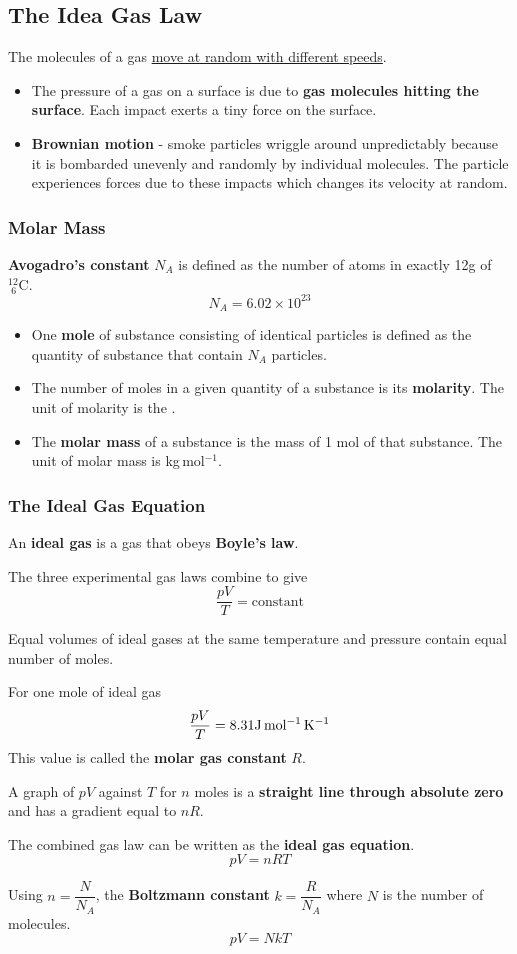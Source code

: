 \subsection{The Idea Gas Law}

The molecules of a gas \underline{move at random with different speeds}.
\begin{itemize}
    \item The pressure of a gas on a surface is due to \textbf{gas molecules hitting the surface}. Each impact exerts a tiny force on the surface.
    \item \textbf{Brownian motion} - smoke particles wriggle around unpredictably because it is bombarded unevenly and randomly by individual molecules. The particle experiences forces due to these impacts which changes its velocity at random.
\end{itemize}

\subsubsection*{Molar Mass}

\textbf{Avogadro's constant} $N_A$ is defined as the number of atoms in exactly 12g of $^{12}_{\hspace{4pt}6}\text{C}$.
$$N_A=6.02\times10^{23}$$

\begin{itemize}
    \item One \textbf{mole} of substance consisting of identical particles is defined as the quantity of substance that contain $N_A$ particles.
    \item The number of moles in a given quantity of a substance is its \textbf{molarity}. The unit of molarity is the .
    \item The \textbf{molar mass} of a substance is the mass of 1 mol of that substance. The unit of molar mass is kg\,mol$^{-1}$.
\end{itemize}

\subsubsection*{The Ideal Gas Equation}

An \textbf{ideal gas} is a gas that obeys \textbf{Boyle's law}.

The three experimental gas laws combine to give
$$\frac{pV}{T}=\text{constant}$$

Equal volumes of ideal gases at the same temperature and pressure contain equal number of moles.

For one mole of ideal gas
$$\frac{pV}{T}=8.31\text{J\,mol$^{-1}$\,K$^{-1}$}$$
This value is called the \textbf{molar gas constant} $R$.

A graph of $pV$ against $T$ for $n$ moles is a \textbf{straight line through absolute zero} and has a gradient equal to $nR$.

The combined gas law can be written as the \textbf{ideal gas equation}.
$$pV=nRT$$

Using $n=\dfrac{N}{N_A}$, the \textbf{Boltzmann constant} $k=\dfrac{R}{N_A}$ where $N$ is the number of molecules.
$$pV=NkT$$
